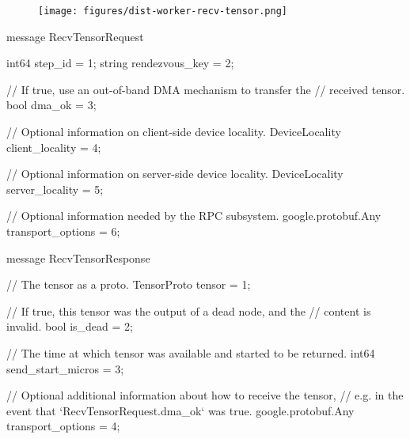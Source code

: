 \begin{content}
\begin{figure}[H]
  \centering
  \texttt{[image: figures/dist-worker-recv-tensor.png]}
  \caption{}
  \label{fig:dist-worker-recv-tensor}
\end{figure}

\begin{leftbar}
\begin{c++}
message RecvTensorRequest {
  int64 step_id = 1;
  string rendezvous_key = 2;

  // If true, use an out-of-band DMA mechanism to transfer the
  // received tensor.
  bool dma_ok = 3;

  // Optional information on client-side device locality.
  DeviceLocality client_locality = 4;

  // Optional information on server-side device locality.
  DeviceLocality server_locality = 5;

  // Optional information needed by the RPC subsystem.
  google.protobuf.Any transport_options = 6;
}

message RecvTensorResponse {
  // The tensor as a proto.
  TensorProto tensor = 1;

  // If true, this tensor was the output of a dead node, and the
  // content is invalid.
  bool is_dead = 2;

  // The time at which tensor was available and started to be returned.
  int64 send_start_micros = 3;

  // Optional additional information about how to receive the tensor,
  // e.g. in the event that `RecvTensorRequest.dma\_ok` was true.
  google.protobuf.Any transport_options = 4;
}
\end{c++}
\end{leftbar}

\end{content}


